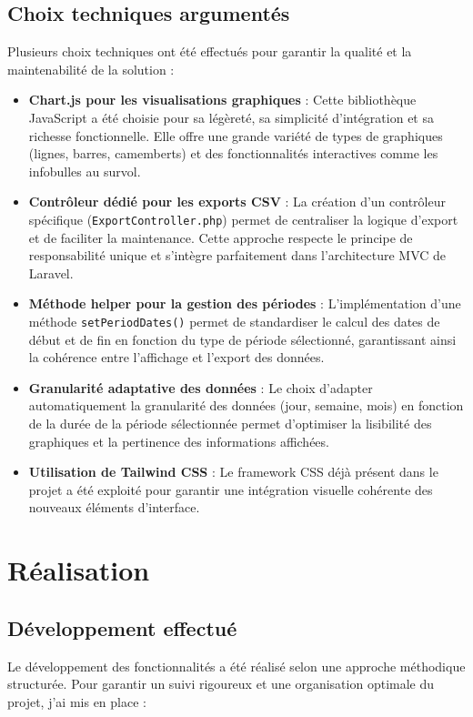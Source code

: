 \documentclass[a4paper,12pt]{report}
\begin{document}
  \subsection{Choix techniques argumentés}
  Plusieurs choix techniques ont été effectués pour garantir la qualité et la maintenabilité de la solution :
  
  \begin{itemize}
    \item \textbf{Chart.js pour les visualisations graphiques} : Cette bibliothèque JavaScript a été choisie pour sa légèreté, sa simplicité d'intégration et sa richesse fonctionnelle. Elle offre une grande variété de types de graphiques (lignes, barres, camemberts) et des fonctionnalités interactives comme les infobulles au survol.
    
    \item \textbf{Contrôleur dédié pour les exports CSV} : La création d'un contrôleur spécifique (\texttt{ExportController.php}) permet de centraliser la logique d'export et de faciliter la maintenance. Cette approche respecte le principe de responsabilité unique et s'intègre parfaitement dans l'architecture MVC de Laravel.
    
    \item \textbf{Méthode helper pour la gestion des périodes} : L'implémentation d'une méthode \texttt{setPeriodDates()} permet de standardiser le calcul des dates de début et de fin en fonction du type de période sélectionné, garantissant ainsi la cohérence entre l'affichage et l'export des données.
    
    \item \textbf{Granularité adaptative des données} : Le choix d'adapter automatiquement la granularité des données (jour, semaine, mois) en fonction de la durée de la période sélectionnée permet d'optimiser la lisibilité des graphiques et la pertinence des informations affichées.
    
    \item \textbf{Utilisation de Tailwind CSS} : Le framework CSS déjà présent dans le projet a été exploité pour garantir une intégration visuelle cohérente des nouveaux éléments d'interface.
  \end{itemize}

\section{Réalisation}
  \subsection{Développement effectué}
  Le développement des fonctionnalités a été réalisé selon une approche méthodique structurée. Pour garantir un suivi rigoureux et une organisation optimale du projet, j'ai mis en place :
  
\end{document}

